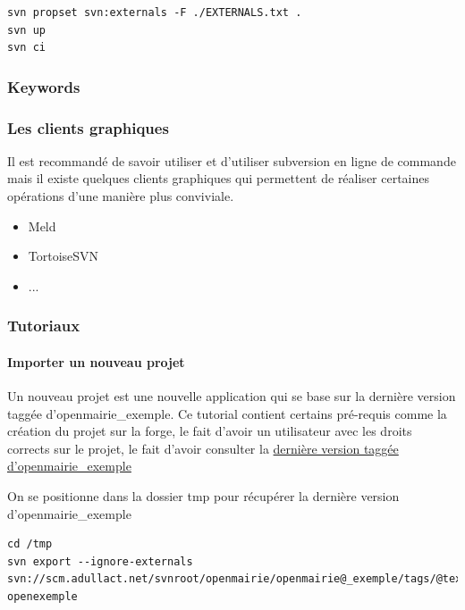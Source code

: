 \documentclass[letterpaper,10pt,french]{manual}
\begin{document}
\begin{Verbatim}[commandchars=@\[\]]
svn propset svn:externals -F ./EXTERNALS.txt .
svn up
svn ci
\end{Verbatim}


\subsubsection{Keywords}


\subsubsection{Les clients graphiques}

Il est recommandé de savoir utiliser et d'utiliser subversion en ligne de
commande mais il existe quelques clients graphiques qui permettent de réaliser
certaines opérations d'une manière plus conviviale.
\begin{itemize}
\item {} 
Meld

\item {} 
TortoiseSVN

\item {} 
...

\end{itemize}


\subsubsection{Tutoriaux}


\paragraph{Importer un nouveau projet}

Un nouveau projet est une nouvelle application qui se base sur la dernière
version taggée d'openmairie\_exemple. Ce tutorial contient certains pré-requis
comme la création du projet sur la forge, le fait d'avoir un utilisateur avec
les droits corrects sur le projet, le fait d'avoir consulter la \href{https://adullact.net/scm/viewvc.php/openmairie\_exemple/tags/?root=openmairie}{dernière
version taggée d'openmairie\_exemple}

On se positionne dans la dossier tmp pour récupérer la dernière version
d'openmairie\_exemple

\begin{Verbatim}[commandchars=@\[\]]
cd /tmp
svn export --ignore-externals svn://scm.adullact.net/svnroot/openmairie/openmairie@_exemple/tags/@textless[]DERNIERE@_VERSION@_OPENMAIRIE@_EXEMPLE@textgreater[]/ openexemple
\end{Verbatim}
\end{document}
